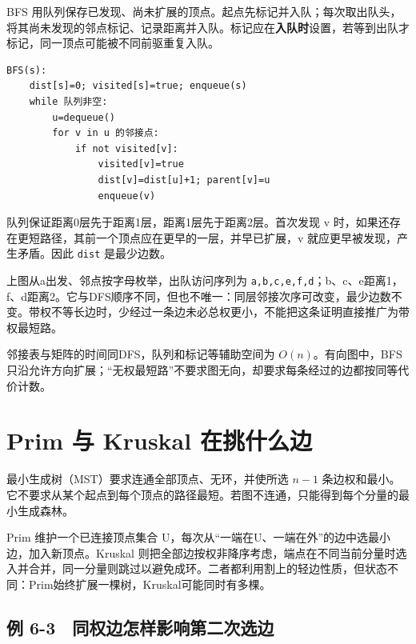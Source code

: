 BFS 用队列保存已发现、尚未扩展的顶点。起点先标记并入队；每次取出队头，将其尚未发现的邻点标记、记录距离并入队。标记应在\textbf{入队时}设置，若等到出队才标记，同一顶点可能被不同前驱重复入队。

\par\medskip\noindent
\begin{minipage}{\linewidth}
\begin{verbatim}
BFS(s):
    dist[s]=0; visited[s]=true; enqueue(s)
    while 队列非空:
        u=dequeue()
        for v in u 的邻接点:
            if not visited[v]:
                visited[v]=true
                dist[v]=dist[u]+1; parent[v]=u
                enqueue(v)
\end{verbatim}
\end{minipage}\par\medskip

队列保证距离0层先于距离1层，距离1层先于距离2层。首次发现 v 时，如果还存在更短路径，其前一个顶点应在更早的一层，并早已扩展，v 就应更早被发现，产生矛盾。因此 \texttt{dist} 是最少边数。

上图从a出发、邻点按字母枚举，出队访问序列为 \texttt{a,}\allowbreak{}\texttt{b,}\allowbreak{}\texttt{c,}\allowbreak{}\texttt{e,}\allowbreak{}\texttt{f,}\allowbreak{}\texttt{d}；b、c、e距离1，f、d距离2。它与DFS顺序不同，但也不唯一：同层邻接次序可改变，最少边数不变。带权不等长边时，少经过一条边未必总权更小，不能把这条证明直接推广为带权最短路。

邻接表与矩阵的时间同DFS，队列和标记等辅助空间为 \(O(n)\)。有向图中，BFS只沿允许方向扩展；``无权最短路''不要求图无向，却要求每条经过的边都按同等代价计数。

\section{Prim 与 Kruskal 在挑什么边}\label{ds-06-06}

最小生成树（MST）要求连通全部顶点、无环，并使所选 \(n-1\) 条边权和最小。它不要求从某个起点到每个顶点的路径最短。若图不连通，只能得到每个分量的最小生成森林。

Prim 维护一个已连接顶点集合 U，每次从``一端在U、一端在外''的边中选最小边，加入新顶点。Kruskal 则把全部边按权非降序考虑，端点在不同当前分量时选入并合并，同一分量则跳过以避免成环。二者都利用割上的轻边性质，但状态不同：Prim始终扩展一棵树，Kruskal可能同时有多棵。


\subsection{例 6-3　同权边怎样影响第二次选边}\label{ds-ex6-3}

